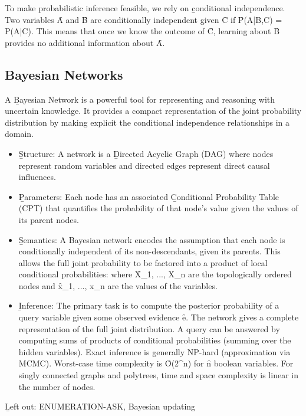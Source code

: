 To make probabilistic inference feasible, we rely on \b{conditional independence}. Two variables \f{A} and \f{B} are conditionally independent given \f{C} if \f{P(A|B,C) = P(A|C)}. This means that once we know the outcome of \f{C}, learning about \f{B} provides no additional information about \f{A}.

\subsection{Bayesian Networks}
A \b{Bayesian Network} is a powerful tool for representing and reasoning with uncertain knowledge. It provides a compact representation of the joint probability distribution by making explicit the conditional independence relationships in a domain.
\begin{itemize}
    \item \b{Structure:} A network is a \b{Directed Acyclic Graph (DAG)} where nodes represent random variables and directed edges represent direct causal influences.
    \item \b{Parameters:} Each node has an associated \b{Conditional Probability Table (CPT)} that quantifies the probability of that node's value given the values of its parent nodes.
    \item \b{Semantics:} A Bayesian network encodes the assumption that each node is conditionally independent of its non-descendants, given its parents. This allows the full joint probability to be factored into a product of local conditional probabilities:
    where \f{X_1, ..., X_n} are the topologically ordered nodes and \f{x_1, ..., x_n} are the values of the variables.
    \item \b{Inference:} The primary task is to compute the posterior probability of a query variable given some observed evidence \f{e}. The network gives a complete representation of the full joint distribution. A query can be answered by computing sums of products of conditional probabilities (summing over the hidden variables). Exact inference is generally NP-hard (approximation via MCMC). Worst-case time complexity is \f{O(2^n)} for \f{n} boolean variables. For singly connected graphs and polytrees, time and space complexity is linear in the number of nodes.
\end{itemize}
\vspace{0.5cm}
\b{Left out:} ENUMERATION-ASK, Bayesian updating